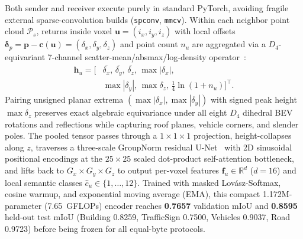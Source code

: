 \documentclass[journal]{IEEEtran}
\begin{document}
Both sender and receiver execute purely in standard PyTorch, avoiding fragile external sparse-convolution builds (\texttt{spconv}, \texttt{mmcv}). Within each neighbor point cloud $\mathcal{P}_s$, returns inside voxel $\mathbf{u} = (i_x, i_y, i_z)$ with local offsets $\boldsymbol{\delta}_p = \mathbf{p} - \mathbf{c}(\mathbf{u}) = (\delta_x, \delta_y, \delta_z)$ and point count $n_u$ are aggregated via a $D_4$-equivariant 7-channel scatter-mean/absmax/log-density operator~\cite{lang2019pointpillars}:
\begin{equation}
\begin{aligned}
\mathbf{h}_u = \big[&\overline{\delta_x},\, \overline{\delta_y},\, \overline{\delta_z},\, \max|\delta_x|,\\
&\max|\delta_y|,\, \max \delta_z,\, \tfrac{1}{4}\ln(1 + n_u)\big]^\top.
\end{aligned}
\label{eq:sender_pool}
\end{equation}
Pairing unsigned planar extrema $(\max|\delta_x|, \max|\delta_y|)$ with signed peak height $\max\delta_z$ preserves exact algebraic equivariance under all eight $D_4$ dihedral BEV rotations and reflections while capturing roof planes, vehicle corners, and slender poles. The pooled tensor passes through a $1\times 1\times 1$ projection, height-collapses along $z$, traverses a three-scale GroupNorm residual U-Net~\cite{ronneberger2015unet,wu2018groupnorm} with 2D sinusoidal positional encodings at the $25\times 25$ scaled dot-product self-attention bottleneck, and lifts back to $G_x\times G_y\times G_z$ to output per-voxel features $\mathbf{f}_u \in \mathbb{R}^{d}$ ($d = 16$) and local semantic classes $\hat{c}_u \in \{1,\dots,12\}$. Trained with masked Lov\'asz-Softmax, cosine warmup, and exponential moving average (EMA), this compact 1.172M-parameter (7.65~GFLOPs) encoder reaches \textbf{0.7657} validation mIoU and \textbf{0.8595} held-out test mIoU (Building 0.8259, TrafficSign 0.7500, Vehicles 0.9037, Road 0.9723) before being frozen for all equal-byte protocols.
\end{document}

